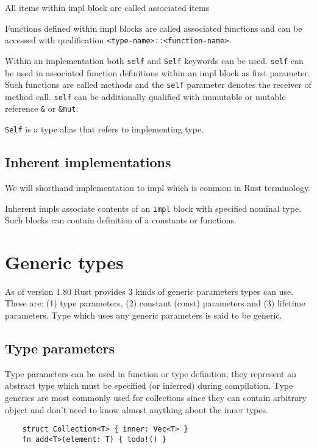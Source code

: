 All items within impl block are called associated items

Functions defined within impl blocks are called associated functions and can be accessed with qualification \texttt{<type-name>::<function-name>}.

Within an implementation both \texttt{self} and \texttt{Self} keywords can be used.
\texttt{self} can be used in associated function definitions within an impl block as first parameter. 
Such functions are called methods and the \texttt{self} parameter denotes the receiver of method call. 
\texttt{self} can be additionally qualified with immutable or mutable reference \texttt{\&} or \texttt{\&mut}.

\texttt{Self} is a type alias that refers to implementing type.

\subsection{Inherent implementations}

We will shorthand implementation to impl which is common in Rust terminology.

Inherent impls associate contents of an \texttt{impl} block with specified nominal type.
Such blocks can contain definition of a constants or functions. 

\section{Generic types}

As of version 1.80 Rust provides 3 kinds of generic parameters types can use. 
These are: (1) type parameters, (2) constant (const) parameters and (3) lifetime parameters. 
Type which uses any generic parameters is said to be generic.

\subsection{Type parameters}

Type parameters can be used in function or type definition; they represent an abstract type which must be specified (or inferred) during compilation.
Type generics are most commonly used for collections since they can contain arbitrary object and don't need to know almost anything about the inner types.

\begin{lstlisting}
    struct Collection<T> { inner: Vec<T> }
    fn add<T>(element: T) { todo!() }
\end{lstlisting}


